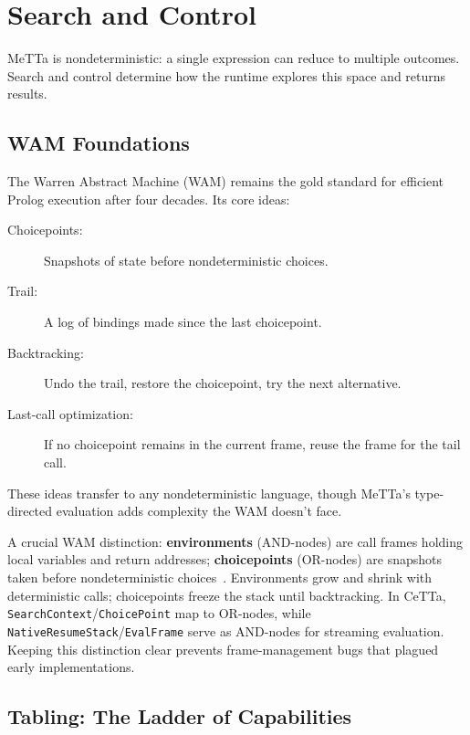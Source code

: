 \documentclass[11pt]{article}
\newcommand{\code}[1]{\texttt{#1}}
\newcommand{\CeTTa}{\textup{CeTTa}}
\newcommand{\WAM}{\textup{WAM}}
\begin{document}
\section{Search and Control}
\label{sec:search}

MeTTa is nondeterministic: a single expression can reduce to multiple
outcomes.  Search and control determine how the runtime explores this
space and returns results.

\subsection{WAM Foundations}

The Warren Abstract Machine (\WAM{}) remains the gold standard for
efficient Prolog execution after four decades.  Its core ideas:

\begin{description}
\item[Choicepoints:] Snapshots of state before nondeterministic choices.
\item[Trail:] A log of bindings made since the last choicepoint.
\item[Backtracking:] Undo the trail, restore the choicepoint, try the
  next alternative.
\item[Last-call optimization:] If no choicepoint remains in the current
  frame, reuse the frame for the tail call.
\end{description}

These ideas transfer to any nondeterministic language, though MeTTa's
type-directed evaluation adds complexity the \WAM{} doesn't face.

A crucial \WAM{} distinction: \textbf{environments} (AND-nodes) are call frames
holding local variables and return addresses; \textbf{choicepoints} (OR-nodes)
are snapshots taken before nondeterministic choices~\cite{Warren1983}.
Environments grow and shrink with deterministic calls; choicepoints freeze the
stack until backtracking.  In \CeTTa{}, \code{SearchContext}/\code{ChoicePoint}
map to OR-nodes, while \code{NativeResumeStack}/\code{EvalFrame} serve as
AND-nodes for streaming evaluation.  Keeping this distinction clear prevents
frame-management bugs that plagued early implementations.

\subsection{Tabling: The Ladder of Capabilities}
\end{document}
